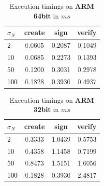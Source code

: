 \documentclass[twocolumn]{article}
\begin{document}
\begin{table}[h!]
  \begin{center}
    \caption{Execution timings on \textbf{ARM 64bit} in $ms$}
    \label{tab:table1}
    \begin{tabular}{l|c|c|r}
      \toprule %
      \textbf{$\sigma_N$} & \textbf{create} & \textbf{sign} & \textbf{verify}\\
      \midrule
      2   & 0.0605 & 0.2087 & 0.1049  \\
      10  & 0.0685 & 0.2273 & 0.1393  \\
      50  & 0.1200 & 0.3031 & 0.2978  \\
      100 & 0.1828 & 0.3930 & 0.4937  \\
      \bottomrule %
    \end{tabular}
  \end{center}
\end{table}

\begin{table}[h!]
  \begin{center}
    \caption{Execution timings on \textbf{ARM 32bit} in $ms$}
    \label{tab:table1}
    \begin{tabular}{l|c|c|r}
      \toprule %
      \textbf{$\sigma_N$} & \textbf{create} & \textbf{sign} & \textbf{verify}\\
      \midrule
      2   & 0.3333 & 1.0439 & 0.5753  \\
      10  & 0.4358 & 1.1458 & 0.7199  \\
      50  & 0.8473 & 1.5151 & 1.6056  \\
      100 & 0.1828 & 0.3930 & 2.4817  \\ %
      \bottomrule %
    \end{tabular}
  \end{center}
\end{table}





\listoffigures

\end{document}
